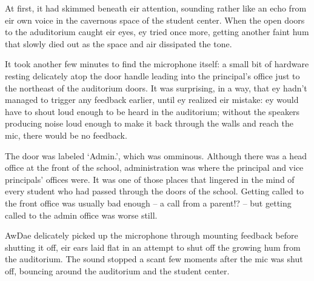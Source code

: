 At first, it had skimmed beneath eir attention, sounding rather like an echo from eir own voice in the cavernous space of the student center.  When the open doors to the aduditorium caught eir eyes, ey tried once more, getting another faint hum that slowly died out as the space and air dissipated the tone.

It took another few minutes to find the microphone itself: a small bit of hardware resting delicately atop the door handle leading into the principal's office just to the northeast of the auditorium doors.  It was surprising, in a way, that ey hadn't managed to trigger any feedback earlier, until ey realized eir mistake: ey would have to shout loud enough to be heard in the auditorium; without the speakers producing noise loud enough to make it back through the walls and reach the mic, there would be no feedback.

The door was labeled `Admin.', which was omminous.  Although there was a head office at the front of the school, administration was where the principal and vice principals' offices were.  It was one of those places that lingered in the mind of every student who had passed through the doors of the school.  Getting called to the front office was usually bad enough -- a call from a parent!? -- but getting called to the admin office was worse still.

AwDae delicately picked up the microphone through mounting feedback before shutting it off, eir ears laid flat in an attempt to shut off the growing hum from the auditorium.  The sound stopped a scant few moments after the mic was shut off, bouncing around the auditorium and the student center.

